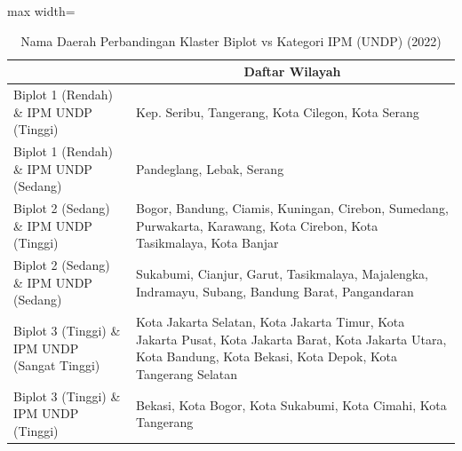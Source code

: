 \begin{table}[H]
\centering
\caption{Nama Daerah Perbandingan Klaster Biplot vs Kategori IPM (UNDP) (2022)} \label{tab:app2crossname2022}
\begin{adjustbox}{max width=\textwidth}
\begin{tabular}{|>{\centering\arraybackslash}p{4cm}|p{10cm}|}
\hline
\multicolumn{1}{|c|}{\textbf{Kategori}} & \multicolumn{1}{c|}{\textbf{Daftar Wilayah}} \\
\hline
Biplot 1 (Rendah) \& IPM UNDP (Tinggi) & Kep. Seribu, Tangerang, Kota Cilegon, Kota Serang \\
\hline
Biplot 1 (Rendah) \& IPM UNDP (Sedang) & Pandeglang, Lebak, Serang \\
\hline
Biplot 2 (Sedang) \& IPM UNDP (Tinggi) & Bogor, Bandung, Ciamis, Kuningan, Cirebon, Sumedang, Purwakarta, Karawang, Kota Cirebon, Kota Tasikmalaya, Kota Banjar \\
\hline
Biplot 2 (Sedang) \& IPM UNDP (Sedang) & Sukabumi, Cianjur, Garut, Tasikmalaya, Majalengka, Indramayu, Subang, Bandung Barat, Pangandaran \\
\hline
Biplot 3 (Tinggi) \& IPM UNDP (Sangat Tinggi) & Kota Jakarta Selatan, Kota Jakarta Timur, Kota Jakarta Pusat, Kota Jakarta Barat, Kota Jakarta Utara, Kota Bandung, Kota Bekasi, Kota Depok, Kota Tangerang Selatan \\
\hline
Biplot 3 (Tinggi) \& IPM UNDP (Tinggi) & Bekasi, Kota Bogor, Kota Sukabumi, Kota Cimahi, Kota Tangerang \\
\hline
\end{tabular}
\end{adjustbox}
\end{table}